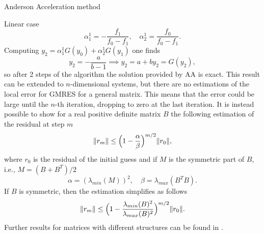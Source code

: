 \documentclass{article}
\begin{document}
\begin{section}{Anderson Acceleration method}
\begin{subsection}{Linear case}
\begin{equation*}
	\alpha_1^1 = -\frac{f_1}{f_0 - f_1}, \quad \alpha_2^1 = \frac{f_0}{f_0 - f_1}.
\end{equation*}
Computing $y_2 = \alpha_1^1 G(y_0) + \alpha_2^1 G(y_1)$ one finds
\begin{equation*}
	y_2 = -\frac{a}{b-1} \implies y_2 = a + by_2 = G(y_2),
\end{equation*}
so after 2 steps of the algorithm the solution provided by AA is exact. This result can be extended to $n$-dimensional systems, but there are no estimations of the local error for GMRES for a general matrix. This means that the error could be large until the $n$-th iteration, dropping to zero at the last iteration. It is instead possible to show \cite{SAAD2} for a real positive definite matrix $B$ the following estimation of the residual at step $m$
\begin{equation}\label{eq:GMRESdp}
	\|r_m\| \leq \Big{(} 1 - \frac{\alpha}{\beta} \Big{)}^{m/2}\|r_0\|,
\end{equation}
where $r_0$ is the residual of the initial guess and if $M$ is the symmetric part of $B$, i.e., $M = (B + B^T)/2$
\begin{equation*}
	\alpha = (\lambda_{min}(M))^2, \quad \beta = \lambda_{max}(B^TB).
\end{equation*}
If $B$ is symmetric, then the estimation simplifies as follows
\begin{equation}\label{eq:GMRESsdp}
	\|r_m\| \leq \Big{(} 1 - \frac{\lambda_{min}(B)^2}{\lambda_{max}(B)^2} \Big{)}^{m/2}\|r_0\|.
\end{equation}
Further results for matrices with different structures can be found in \cite{SAAD2}.
\end{subsection}

\end{section}
\end{document}
